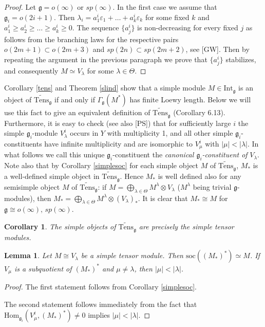 \documentclass{birkmult}
\newcounter{theorem}
\newtheorem{lemma}[theo]{Lemma}
\newtheorem{corollary}[theo]{Corollary}
\renewcommand{\gg}{\mathfrak{g}}
\newcommand{\refth}[1]{Theorem \ref{#1}}
\newcommand{\refcor}[1]{Corollary \ref{#1}}
\newcommand{\ds}{\displaystyle}
\newcommand{\Int}{\mathrm{Int}}
\newcommand{\lind}{\widetilde{\mathrm{Tens}}}
\newcommand{\soc}{\mathrm{soc}}
\renewcommand{\hom}{\mathrm{Hom}}
\begin{document}
\begin{proof}
Let $\gg=o(\infty)$ or $sp(\infty)$. In the first case we assume that
$\gg_i=o(2i+1)$. Then
$\lambda_i=a^i_1\varepsilon_1+\dots+a^i_k\varepsilon_k$
for some fixed $k$ and $a^i_1\geq a^i_2\geq\dots\geq a^i_k\geq 0$. The
sequence $\{a^i_j\}$ is non-decreasing for every fixed $j$ as follows
from the branching laws for the respective pairs $o(2m+1)\subset o(2m+3)$
and $sp(2n)\subset sp(2m+2)$, see [GW]. Then by
repeating the argument in the previous paragraph we prove that
$\{a^i_j\}$ stabilizes, and consequently $M\simeq V_\lambda$ for some $\lambda\in\Theta$.
\end{proof}

\refcor{tens} and \refth{slind} show that a simple module $M\in\Int_\gg$
is an object of $\lind_\gg$ if and only if $\Gamma_\gg(M^*)$ has finite
Loewy length. Below we will use this fact to give an equivalent 
definition of $\lind_\gg$ (Corollary 6.13). Furthermore, it
is easy to check (see also [PS]) that for sufficiently large
$i$ the simple $\gg_i$-module $V^i_\lambda$ occurs in $Y$ with
multiplicity 1, and all other simple $\gg_i$-constituents have
infinite multiplicity and are isomorphic to $V^i_{\mu}$ with
$|\mu|<|\lambda|$. In what follows we call this unique
$\gg_i$-constituent the {\it canonical $\gg_i$-constituent of}
$V_\lambda$. Note also that by Corollary \ref{simplesoc} for each
simple object $M$ of $\lind_\gg$, $M_*$ is a well-defined simple
object in $\lind_\gg$. Hence $M_*$ is well defined also for any
semisimple object $M$ of $\lind_\gg$: if $\ds
M=\bigoplus_{\lambda\in\Theta}M^\lambda\otimes V_\lambda$
($M^\lambda$ being trivial $\gg$-modules), then $\ds
M_*=\bigoplus_{\lambda\in\Theta}M^\lambda\otimes (V_\lambda)_*$.
It is clear that $M_*\cong M$ for $\gg\cong o(\infty),\,
sp(\infty)$.

\begin{corollary} The simple objects of $\lind_\gg$ are precisely the
  simple tensor modules.
\end{corollary}


\begin{lemma}\label{injhull} Let $M\cong V_\lambda$ be a simple tensor
 module. Then $\soc((M_*)^*)\simeq M$.
If $V_\mu$ is a subquotient of $(M_*)^*$ and $\mu\neq\lambda$,
then $|\mu|<|\lambda|$.
\end{lemma}
\begin{proof} The first statement follows from Corollary \ref{simplesoc}.

The second statement follows immediately from the fact that
$\hom_{\gg_i}(V_\mu^i,(M_*)^*)\neq 0$ implies $|\mu|<|\lambda|$.
\end{proof}
\end{document}
